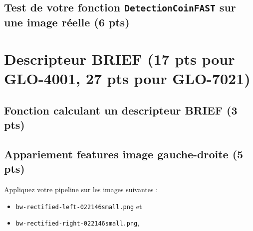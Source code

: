 \documentclass[12pt]{article}
\begin{document}
\subsection{Test de votre fonction \texttt{DetectionCoinFAST} sur une image réelle (6 pts)}

\newpage
\section{Descripteur BRIEF (17 pts pour GLO-4001, 27 pts pour GLO-7021)}

\subsection{Fonction calculant un descripteur BRIEF (3 pts)}

\subsection{Appariement features image gauche-droite (5 pts)}
 Appliquez votre pipeline sur les images suivantes :
 \begin{itemize}
 \item \texttt{bw-rectified-left-022146small.png} et
 \item \texttt{bw-rectified-right-022146small.png},
 \end{itemize}
\end{document}
